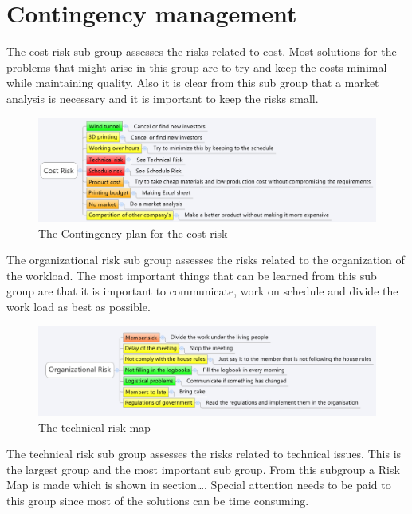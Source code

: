 \documentclass[a4paper]{report}
\begin{document}
\section{Contingency management}
The cost risk sub group assesses the risks related to cost. Most solutions for the problems that might arise in this group are to try and keep the costs minimal while maintaining quality. Also it is clear from this sub group that a market analysis is necessary and it is important to keep the risks small.
\begin{figure}[H]
\label{fig:riskcost}
\centering
\includegraphics[scale=0.6]{Figures/riskmindcost.png}
\caption{The Contingency plan for the cost risk }
\end{figure}

The organizational risk sub group assesses the risks related to the organization of the workload. The most important things that can be learned from this sub group are that it is important to communicate, work on schedule and divide the work load as best as possible. 

\begin{figure}[H]
\label{fig:riskorgan}
\centering
\includegraphics[scale=0.6]{Figures/riskmindorgan.png}
\caption{The technical risk map }
\end{figure}

The technical risk sub group assesses the risks related to technical issues. This is the largest group and the most important sub group. From this subgroup a Risk Map is made which is shown in section…. Special attention needs to be paid to this group since most of the solutions can be time consuming. 
\end{document}
